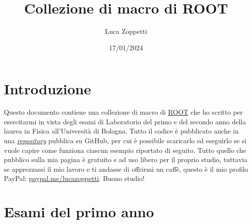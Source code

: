 \documentclass{article}
\title{Collezione di macro di ROOT}
\author{Luca Zoppetti}
\date{17/01/2024}
\begin{document}
\maketitle

\tableofcontents

\section*{Introduzione}
Questo documento contiene una collezione di macro di \href{https://root.cern}{ROOT} che ho scritto per esercitarmi in vista degli esami di Laboratorio del primo e del secondo anno della laurea in Fisica all'Università di Bologna. Tutto il codice è pubblicato anche in una \href{https://github.com/LuckeeDev/root}{\emph{repository}} pubblica su GitHub, per cui è possibile scaricarlo ed eseguirlo se si vuole capire come funziona ciascun esempio riportato di seguito. Tutto quello che pubblico sulla mia pagina è gratuito e ad uso libero per il proprio studio, tuttavia se apprezzassi il mio lavoro e ti andasse di offrirmi un caffè, questo è il mio profilo PayPal: \href{https://paypal.me/lucazoppetti}{paypal.me/lucazoppetti}. Buono studio!

\section{Esami del primo anno}














\end{document}
